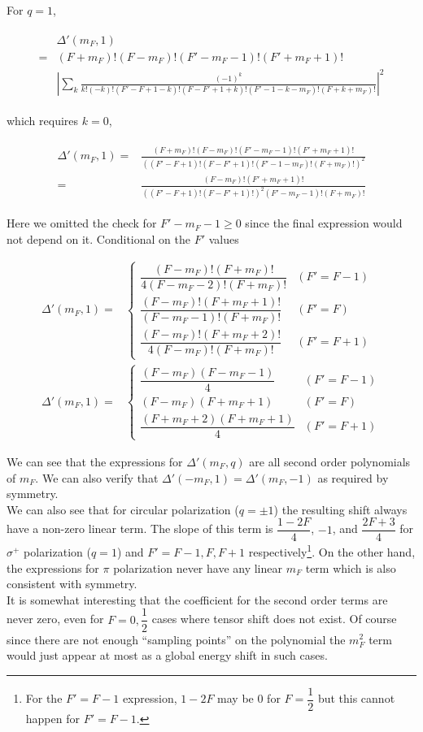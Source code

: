 \documentclass[10pt,fleqn]{article}
\newcommand{\eqar}[1]
{
  \begin{align}
    #1
  \end{align}
}
\newcommand{\paren}[1]{{\left({#1}\right)}}
\newcommand{\abs}[1]{{\left|{#1}\right|}}
\begin{document}
For $q=1$,
\eqar{
  \begin{split}
    &\Delta'(m_F,1)\\
    =&(F+m_F)!(F-m_F)!(F'-m_F-1)!(F'+m_F+1)!\\
    &\abs{\sum_{k}\frac{(-1)^k}{k!(-k)!(F'-F+1-k)!(F-F'+1+k)!(F'-1-k-m_F)!(F+k+m_F)!}}^2
  \end{split}
}
which requires $k=0$,
\eqar{
  \begin{split}
    \Delta'(m_F,1)=&\frac{(F+m_F)!(F-m_F)!(F'-m_F-1)!(F'+m_F+1)!}
                     {\paren{(F'-F+1)!(F-F'+1)!(F'-1-m_F)!(F+m_F)!}^2}\\
    =&\frac{(F-m_F)!(F'+m_F+1)!}{\paren{(F'-F+1)!(F-F'+1)!}^2(F'-m_F-1)!(F+m_F)!}
  \end{split}
}
Here we omitted the check for $F'-m_F-1\geqslant0$ since the final expression
would not depend on it. Conditional on the $F'$ values
\eqar{
  \Delta'(m_F,1)=&\begin{cases}
    \dfrac{(F-m_F)!(F+m_F)!}{4(F-m_F-2)!(F+m_F)!}&(F'=F-1)\\
    \dfrac{(F-m_F)!(F+m_F+1)!}{(F-m_F-1)!(F+m_F)!}&(F'=F)\\
    \dfrac{(F-m_F)!(F+m_F+2)!}{4(F-m_F)!(F+m_F)!}&(F'=F+1)
  \end{cases}\\
  \Delta'(m_F,1)=&\begin{cases}
    \dfrac{(F-m_F)(F-m_F-1)}{4}&(F'=F-1)\\
    (F-m_F)(F+m_F+1)&(F'=F)\\
    \dfrac{(F+m_F+2)(F+m_F+1)}{4}&(F'=F+1)
  \end{cases}
}

We can see that the expressions for $\Delta'(m_F,q)$ are
all second order polynomials of $m_F$. We can also verify that
$\Delta'(-m_F,1)=\Delta'(m_F,-1)$ as required by symmetry.\\

We can also see that for circular polarization ($q=\pm1$) the resulting shift
always have a non-zero linear term. The slope of this term is $\dfrac{1-2F}{4}$, $-1$,
and $\dfrac{2F+3}{4}$ for $\sigma^+$ polarization ($q=1$)
and $F'=F-1,F,F+1$ respectively\footnote{For the $F'=F-1$ expression, $1-2F$ may be $0$ for $F=\dfrac{1}{2}$ but this cannot happen for $F'=F-1$.}.
On the other hand, the expressions for $\pi$ polarization never
have any linear $m_F$ term which is also consistent with symmetry.\\

It is somewhat interesting that the coefficient for the second order terms
are never zero, even for $F=0,\dfrac{1}{2}$ cases where tensor shift does not exist.
Of course since there are not enough ``sampling points'' on the polynomial
the $m_F^2$ term would just appear at most as a global energy shift in such cases.
\end{document}
